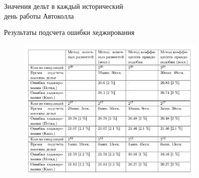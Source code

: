 \documentclass[aspectratio=169]{beamer}
\begin{document}
 \begin{frame}{Значения дельт в каждый исторический \\ день работы Автоколла}
\begin{figure}[h]
\begin{minipage}[h]{0.49\linewidth}
\end{minipage}
\hfill
\begin{minipage}[h]{0.49\linewidth}
\end{minipage}

\label{ris:image1}
\end{figure}


 \end{frame} 
\begin{frame}{Результаты подсчета ошибки хеджирования}
\begin{figure}[h!]
    {\includegraphics[width=9.2cm]{015.png}}
\end{figure}

\end{frame}
\end{document}
